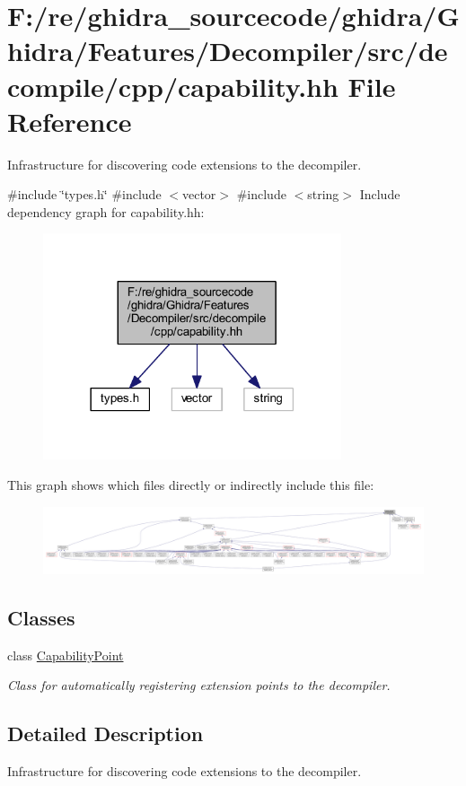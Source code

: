 \hypertarget{capability_8hh}{}\section{F\+:/re/ghidra\+\_\+sourcecode/ghidra/\+Ghidra/\+Features/\+Decompiler/src/decompile/cpp/capability.hh File Reference}
\label{capability_8hh}


Infrastructure for discovering code extensions to the decompiler.  


{\ttfamily \#include \char`\"{}types.\+h\char`\"{}}\newline
{\ttfamily \#include $<$vector$>$}\newline
{\ttfamily \#include $<$string$>$}\newline
Include dependency graph for capability.\+hh\+:
\nopagebreak
\begin{figure}[H]
\begin{center}
\leavevmode
\includegraphics[width=249pt]{capability_8hh__incl}
\end{center}
\end{figure}
This graph shows which files directly or indirectly include this file\+:
\nopagebreak
\begin{figure}[H]
\begin{center}
\leavevmode
\includegraphics[width=350pt]{capability_8hh__dep__incl}
\end{center}
\end{figure}
\subsection*{Classes}
\begin{DoxyCompactItemize}
\item 
class \mbox{\hyperlink{class_capability_point}{Capability\+Point}}
\begin{DoxyCompactList}\small\item\em Class for automatically registering extension points to the decompiler. \end{DoxyCompactList}\end{DoxyCompactItemize}


\subsection{Detailed Description}
Infrastructure for discovering code extensions to the decompiler. 

